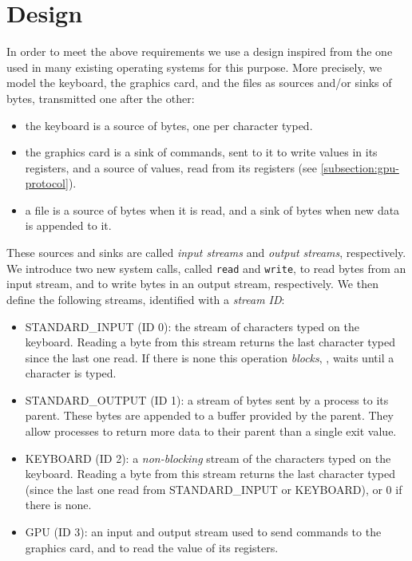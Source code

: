 \section{Design}

In order to meet the above requirements we use a design inspired from the one
used in many existing operating systems for this purpose. More precisely, we
model the keyboard, the graphics card, and the files as sources and/or sinks of
bytes, transmitted one after the other:
\begin{itemize}
  \item the keyboard is a source of bytes, one per character typed.

  \item the graphics card is a sink of commands, sent to it to write values in
  its registers, and a source of values, read from its registers (see
  \cref{subsection:gpu-protocol}).

  \item a file is a source of bytes when it is read, and a sink of bytes when
  new data is appended to it.
\end{itemize}

These sources and sinks are called {\em input streams} and {\em output
streams}, respectively. We introduce two new system calls, called {\tt read}
and {\tt write}, to read bytes from an input stream, and to write bytes in an
output stream, respectively. We then define the following streams, identified
with a {\em stream ID}:
\begin{itemize}
  \item STANDARD\_INPUT (ID 0): the stream of characters typed on the keyboard.
  Reading a byte from this stream returns the last character typed since the
  last one read. If there is none this operation {\em blocks}, \ie, waits until
  a character is typed.

  \item STANDARD\_OUTPUT (ID 1): a stream of bytes sent by a process to its
  parent. These bytes are appended to a buffer provided by the parent. They
  allow processes to return more data to their parent than a single exit value.

  \item KEYBOARD (ID 2): a {\em non-blocking} stream of the characters typed on
  the keyboard. Reading a byte from this stream returns the last character
  typed (since the last one read from STANDARD\_INPUT or KEYBOARD), or 0 if
  there is none.

  \item GPU (ID 3): an input and output stream used to send commands to the
  graphics card, and to read the value of its registers.
\end{itemize}

